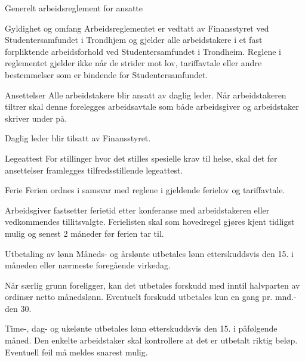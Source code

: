 


\begin{lovkapittel}{Generelt arbeidsreglement for ansatte}


    \begin{lovparagraf}{Gyldighet og omfang}
        Arbeidsreglementet er vedtatt av Finansstyret ved Studentersamfundet i Trondhjem og gjelder alle arbeidstakere i et
        fast forpliktende arbeidsforhold ved Studentersamfundet i Trondheim.
        Reglene i reglementet gjelder ikke når de strider mot lov, tariffavtale eller andre bestemmelser som er bindende for
        Studentersamfundet.
    \end{lovparagraf}

    \begin{lovparagraf}{Ansettelser}
        Alle arbeidstakere blir ansatt av daglig leder. Når arbeidstakeren tiltrer skal denne forelegges arbeidsavtale som både
        arbeidsgiver og arbeidstaker skriver under på.

        Daglig leder blir tilsatt av Finansstyret.
    \end{lovparagraf}

    \begin{lovparagraf}{Legeattest}
        For stillinger hvor det stilles spesielle krav til helse, skal det før ansettelser framlegges tilfredsstillende legeattest.
    \end{lovparagraf}

    \begin{lovparagraf}{Ferie}
        Ferien ordnes i samsvar med reglene i gjeldende ferielov og tariffavtale.

        Arbeidsgiver fastsetter ferietid etter konferanse med arbeidstakeren eller vedkommendes tillitsvalgte. Ferielisten skal
        som hovedregel gjøres kjent tidligst mulig og senest 2 måneder før ferien tar til.
    \end{lovparagraf}

    \begin{lovparagraf}{Utbetaling av lønn}
        Måneds- og årslønte utbetales lønn etterskuddsvis den 15. i måneden eller nærmeste foregående virkedag.

        Når særlig grunn foreligger, kan det utbetales forskudd med inntil halvparten av ordinær netto månedslønn. Eventuelt
        forskudd utbetales kun en gang pr. mnd.- den 30.

        Time-, dag- og ukelønte utbetales lønn etterskuddsvis den 15. i påfølgende måned. Den enkelte arbeidstaker skal kontrollere at det er utbetalt riktig beløp. Eventuell feil må meldes snarest mulig.


\end{lovparagraf}
\end{lovkapittel}
